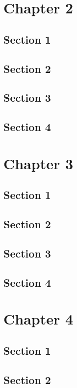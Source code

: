 \documentclass{SPhDThesis}
\begin{document}
	\begin{frontmatter}
		\SgAddTitle%
		\SgAddDeclaration%
		\SgAddToc%
		\SgAddLof%
		\SgAddLot%
		\SgAddLoa%
	\end{frontmatter}
   
	
	\chapter{Chapter 2}
		\section{Section 1}
		\section{Section 2}
		\section{Section 3}
		\section{Section 4}
	\chapter{Chapter 3}
		\section{Section 1}
		\section{Section 2}
		\section{Section 3}
		\section{Section 4}
	\chapter{Chapter 4}
		\section{Section 1}
		\section{Section 2}
\end{document}
